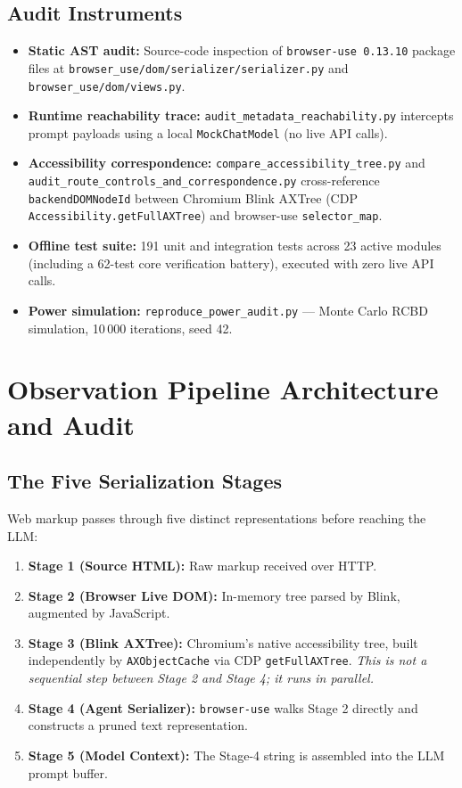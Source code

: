 \documentclass[conference]{IEEEtran}
\begin{document}
\subsection{Audit Instruments}
\begin{itemize}
    \item \textbf{Static AST audit:} Source-code inspection of \texttt{browser-use 0.13.10} package files at \texttt{browser\_use/dom/serializer/serializer.py} and \texttt{browser\_use/dom/views.py}.
    \item \textbf{Runtime reachability trace:} \texttt{audit\_metadata\_reachability.py} intercepts prompt payloads using a local \texttt{MockChatModel} (no live API calls).
    \item \textbf{Accessibility correspondence:} \texttt{compare\_accessibility\_tree.py} and \texttt{audit\_route\_controls\_and\_correspondence.py} cross-reference \texttt{backendDOMNodeId} between Chromium Blink AXTree (CDP \texttt{Accessibility.getFullAXTree}) and browser-use \texttt{selector\_map}.
    \item \textbf{Offline test suite:} 191 unit and integration tests across 23 active modules (including a 62-test core verification battery), executed with zero live API calls.
    \item \textbf{Power simulation:} \texttt{reproduce\_power\_audit.py} --- Monte Carlo RCBD simulation, 10\,000 iterations, seed 42.
\end{itemize}

\section{Observation Pipeline Architecture and Audit}
\label{sec:architecture}

\subsection{The Five Serialization Stages}

Web markup passes through five distinct representations before reaching the LLM:
\begin{enumerate}
    \item \textbf{Stage 1 (Source HTML):} Raw markup received over HTTP.
    \item \textbf{Stage 2 (Browser Live DOM):} In-memory tree parsed by Blink, augmented by JavaScript.
    \item \textbf{Stage 3 (Blink AXTree):} Chromium's native accessibility tree, built independently by \texttt{AXObjectCache} via CDP \texttt{getFullAXTree}. \emph{This is not a sequential step between Stage 2 and Stage 4; it runs in parallel.}
    \item \textbf{Stage 4 (Agent Serializer):} \texttt{browser-use} walks Stage 2 directly and constructs a pruned text representation.
    \item \textbf{Stage 5 (Model Context):} The Stage-4 string is assembled into the LLM prompt buffer.
\end{enumerate}
\end{document}
